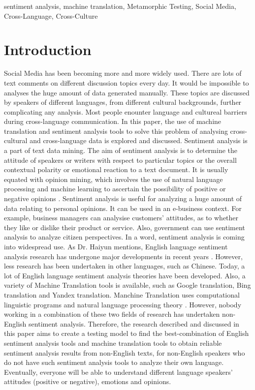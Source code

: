 \documentclass[conference]{IEEEtran}
\begin{document}
\begin{IEEEkeywords}
sentiment analysis, machine translation, Metamorphic Testing, Social Media,
Cross-Language, Cross-Culture
\end{IEEEkeywords}

\section{Introduction}

Social Media has been becoming more and more widely used. There are lots of text comments
on different discussion topics every day.
It would be impossible to analyses the huge amount of data generated manually.
These topics are discussed by speakers of different languages, from different
cultural backgrounds, further complicating any analysis.
Most people enounter language and cultureal barriers during cross-language
communication.
In this paper, the use of machine translation and sentiment analysis tools to
solve this problem of analysing cross-cultural and cross-language data is
explored and discussed.
Sentiment analysis is a part of text data mining. The aim of sentiment analysis
is to determine the attitude of speakers or writers with respect to particular topics
or the overall contextual polarity or emotional reaction to a text document. It is usually equated with
opinion mining, which involves the use of natural language processing and
machine learning to ascertain the possibility of positive or negative opinions \cite{sentimentAnalysis}.
Sentiment analysis is useful for analyzing a huge amount of data relating to personal
opinions. It can be used in an e-business context. For example, business managers can analysise
customers' attitudes, as to whether they like or dislike their product or service.
Also, government can use sentiment analysis to analyze citizen perspectives.
In a word, sentiment analysis is coming into widespread use.
As Dr. Haiyun mentions, English language sentiment analysis research has
undergone major developments in recent years \cite{ChineseSentimentAnalysis}.
However, less research has been undertaken in other languages, such as Chinese.
Today, a lot of English language sentiment analysis theories have been
developed. Also, a variety of Machine Translation tools is available, such as Google
translation, Bing translation and Yandex translation.
Manchine Translation uses computational linguistic programs and natural language
processing theory \cite{machineTranslation}.
However, nobody working in a combination of these two fields of research has undertaken non-English
sentiment analysis. Therefore, the research described and discussed in this paper aims to create a testing model to find the best-combination of English
sentiment analysis tools and machine translation tools to obtain reliable
sentiment analysis results from non-English texts, for non-English speakers who
do not have such sentiment analysis tools to analyze their own language.
Eventually, everyone will be able to understand different language speakers'
attitudes (positive or negative), emotions and opinions.\\
\end{document}
